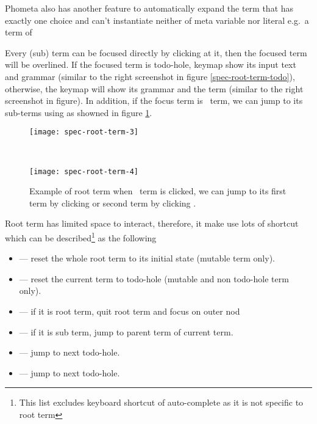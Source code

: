 \documentclass[master.tex]{subfiles}
\begin{document}
Phometa also has another feature to automatically expand the term that has
exactly one choice and can't instantiate neither of meta variable nor literal
e.g.\ a term of 

Every (sub) term can be focused directly by clicking at it, then the focused
term will be overlined. If the focused term is todo-hole, keymap show its input
text and grammar (similar to the right screenshot in figure
\ref{spec-root-term-todo}), otherwise, the keymap will show its grammar and the
term (similar to the right screenshot in figure). In addition, if the focus term
is \kChoice\ term, we can jump to its sub-terms using  as showned
in figure \ref{spec-root-term-non-todo}.

\begin{figure}[H]
    \centering

\begin{minipage}{0.40\textwidth}
\begin{flushleft}
    \texttt{[image: spec-root-term-3]}
\end{flushleft}
\end{minipage}
~
\begin{minipage}{0.35\textwidth}
\begin{flushright}
    \texttt{[image: spec-root-term-4]}
\end{flushright}
\end{minipage}
\caption{Example of root term when \kChoice\ term is clicked, we can jump to its
  first term by clicking  or second term by clicking .}
\label{spec-root-term-non-todo}
\end{figure}

Root term has limited space to interact, therefore, it make use lots of shortcut
which can be described\footnote{This list excludes keyboard shortcut of
  auto-complete as it is not specific to root term} as the following

\begin{itemize}
\item {} --- reset the whole root term to its initial state (mutable term only).
\item {} --- reset the current term to todo-hole (mutable and non
  todo-hole term only).
\item {} --- if it is root term, quit root term and focus on outer nod
\item {} --- if it is sub term, jump to parent term of current term.
\item {} --- jump to next todo-hole.
\item {} --- jump to next todo-hole.
\end{itemize}
\end{document}
